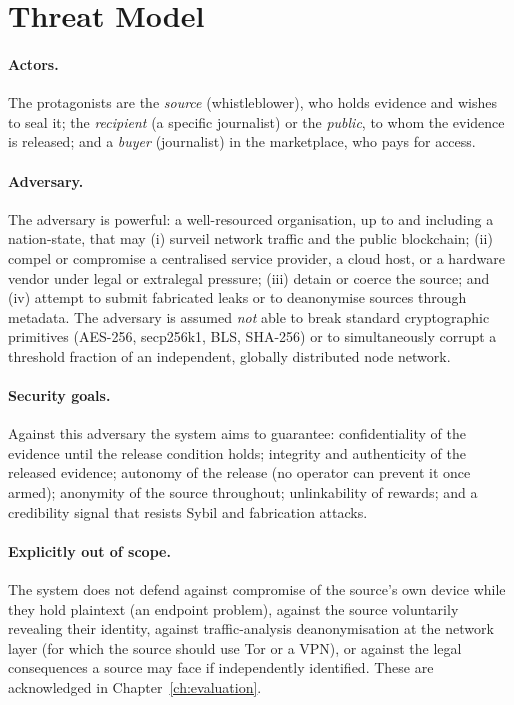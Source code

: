 \section{Threat Model}
\label{sec:design-threat}

\paragraph{Actors.} The protagonists are the \emph{source} (whistleblower), who
holds evidence and wishes to seal it; the \emph{recipient} (a specific
journalist) or the \emph{public}, to whom the evidence is released; and a
\emph{buyer} (journalist) in the marketplace, who pays for access.

\paragraph{Adversary.} The adversary is powerful: a well-resourced organisation,
up to and including a nation-state, that may (i) surveil network traffic and the
public blockchain; (ii) compel or compromise a centralised service provider, a
cloud host, or a hardware vendor under legal or extralegal pressure; (iii) detain
or coerce the source; and (iv) attempt to submit fabricated leaks or to
deanonymise sources through metadata. The adversary is assumed \emph{not} able to
break standard cryptographic primitives (AES-256, secp256k1, BLS, SHA-256) or to
simultaneously corrupt a threshold fraction of an independent, globally
distributed node network.

\paragraph{Security goals.} Against this adversary the system aims to guarantee:
confidentiality of the evidence until the release condition holds; integrity and
authenticity of the released evidence; autonomy of the release (no operator can
prevent it once armed); anonymity of the source throughout; unlinkability of
rewards; and a credibility signal that resists Sybil and fabrication attacks.

\paragraph{Explicitly out of scope.} The system does not defend against
compromise of the source's own device while they hold plaintext (an endpoint
problem), against the source voluntarily revealing their identity, against
traffic-analysis deanonymisation at the network layer (for which the source
should use Tor or a VPN), or against the legal consequences a source may face if
independently identified. These are acknowledged in Chapter~\ref{ch:evaluation}.

